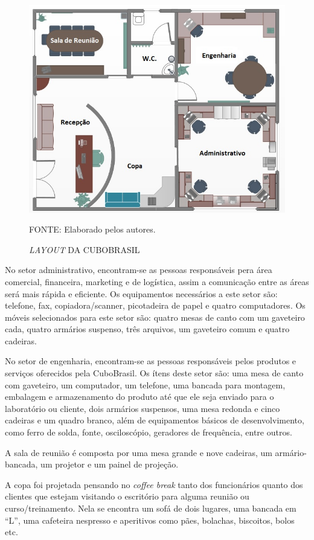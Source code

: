 \documentclass[
	12pt,				%
	openright,			%
	oneside,			%
	a4paper,			%
	english,			%
	french,				%
	spanish,			%
	brazil				%
	]{abntex2}
\begin{document}
	\begin{figure}[th]
		\caption{\textit{LAYOUT} DA CUBOBRASIL}
		\label{layout}
		\centering
		\includegraphics[width=0.7\linewidth]{./figs/layout}
		
		\begin{small}
			FONTE: Elaborado pelos autores.
		\end{small}
	\end{figure}\pagebreak
	
 	No setor administrativo, encontram-se as pessoas responsáveis pera área comercial, financeira, marketing e de logística, assim a comunicação entre as áreas será mais rápida e eficiente. Os equipamentos necessários a este setor são: telefone, fax, copiadora/scanner, picotadeira de papel e quatro computadores. Os móveis selecionados para este setor são: quatro mesas de canto com um gaveteiro cada, quatro armários suspenso, três arquivos, um gaveteiro comum e quatro cadeiras.
 	
	No setor de engenharia, encontram-se as pessoas responsáveis pelos produtos e serviços oferecidos pela CuboBrasil. Os ítens deste setor são: uma mesa de canto com gaveteiro, um computador, um telefone, uma bancada para montagem, embalagem e armazenamento do produto até que ele seja enviado para o laboratório ou cliente, dois armários suspensos, uma mesa redonda e cinco cadeiras e um quadro branco, além de equipamentos básicos de desenvolvimento, como ferro de solda, fonte, osciloscópio, geradores de frequência, entre outros.
	
	A sala de reunião é composta por uma mesa grande e nove cadeiras, um armário-bancada, um projetor e um painel de projeção.
	
	A copa foi projetada pensando no \textit{coffee break} tanto dos funcionários quanto dos clientes que estejam visitando o escritório para alguma reunião ou curso/treinamento. Nela se encontra um sofá de dois lugares, uma bancada em “L”, uma cafeteira nespresso e aperitivos como pães, bolachas, biscoitos, bolos etc.
	
\end{document}

